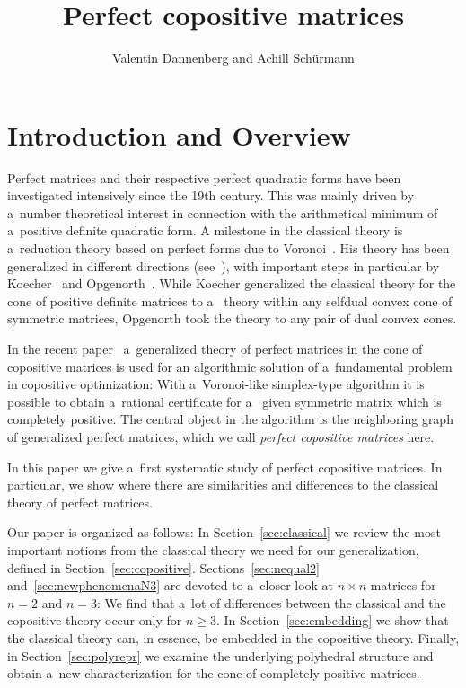 \documentclass{commat}
\title{%
    Perfect copositive matrices
    }
\author{%
    Valentin Dannenberg and Achill Sch\"urmann
    }
\begin{document}
\section{Introduction and Overview}

Perfect matrices and their respective perfect quadratic forms have been investigated intensively since the
19th century.
This was mainly driven by a~number theoretical interest in connection with the arithmetical minimum
of a~positive definite quadratic form.
A milestone in the classical theory is a~reduction theory based on perfect forms due to
Voronoi~\cite{voronoi-1907}.
His theory has been generalized in different directions (see~\cite{martinet-2002}), with important
steps in particular by Koecher~\cite{koecher-1960, koecher-1960a} and
Opgenorth~\cite{opgenorth-2001}.
While Koecher generalized the classical theory for the cone of positive definite matrices to a~
theory within any selfdual convex cone of symmetric matrices, Opgenorth took the theory to any
pair of dual convex cones.

In the recent paper~\cite{dsv-2021} a~generalized theory of perfect matrices in
the cone of copositive matrices is used for an algorithmic solution of a~fundamental problem in
copositive optimization:
With a~Voronoi-like simplex-type algorithm it is possible to obtain a~rational certificate for a~
given symmetric matrix which is completely positive.
The central object in the algorithm is the neighboring graph of generalized perfect matrices,
which we call \emph{perfect copositive matrices} here.

In this paper we give a~first systematic study of perfect copositive matrices.
In particular, we show where there are similarities and differences to the classical theory of
perfect matrices.

Our paper is organized as follows:
In Section~\ref{sec:classical} we review the most important notions from the classical theory we
need for our generalization, defined in Section~\ref{sec:copositive}.
Sections~\ref{sec:nequal2} and~\ref{sec:newphenomenaN3} are devoted to a~closer look at
\(n\times n \) matrices for \(n=2 \) and \(n=3 \):
We find that a~lot of differences between the classical and the copositive theory occur only for
\(n \geq 3 \).
In Section~\ref{sec:embedding} we show that the classical theory can, in essence, be embedded in
the copositive theory.
Finally, in Section~\ref{sec:polyrepr} we examine the underlying polyhedral structure
and obtain a~new characterization for the cone of completely positive matrices.
\end{document}
